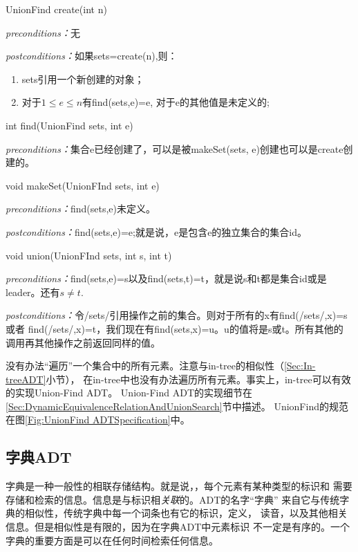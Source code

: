 \begin{figure*}[!t]
\colorbox[rgb]{0.9, 0.9, 0.9}{UnionFind create(int n)}

\emph{preconditions：}无

\emph{postconditions：}如果sets=create(n),则：
\begin{enumerate}
\item sets引用一个新创建的对象；
\item 对于$1\leq e \leq n$有find(sets,e)=e, 对于e的其他值是未定义的;
\end{enumerate}

\colorbox[rgb]{0.9, 0.9, 0.9}{int find(UnionFind sets, int e)}

\emph{preconditions：}集合{e}已经创建了，可以是被makeSet(sets, e)创建也可以是create创建的。

\colorbox[rgb]{0.9, 0.9, 0.9}{void makeSet(UnionFInd sets, int e)}

\emph{preconditions：}find(sets,e)未定义。

\emph{postconditions：}find(sets,e)=e;就是说，e是包含e的独立集合的集合id。

\colorbox[rgb]{0.9, 0.9, 0.9}{void union(UnionFInd sets, int s, int t)}

\emph{preconditions：}find(sets,e)=s以及find(sets,t)=t，就是说s和t都是集合id或是leader。还有$s\neq t$.

\emph{postconditions：}令/sets/引用操作之前的集合。则对于所有的x有find(/sets/,x)=s或者
                        find(/sets/,x)=t，我们现在有find(sets,x)=u。u的值将是s或t。所有其他的
                        调用再其他操作之前返回同样的值。


    \caption{UnionFind ADT的规范。构造函数是create；find是存取函数，makeSet和union是处理函数}
    \label{Fig:UnionFind ADTSpecification}
\end{figure*}

没有办法“遍历”一个集合中的所有元素。注意与in-tree的相似性（\ref{Sec:In-treeADT}小节），
在in-tree中也没有办法遍历所有元素。事实上，in-tree可以有效的实现Union-Find ADT。
Union-Find ADT的实现细节在\ref{Sec:DynamicEquivalenceRelationAndUnionSearch}节中描述。
UnionFind的规范在图\ref{Fig:UnionFind ADTSpecification}中。

\subsection{字典ADT}\label{Sec:2_5_3DictionaryADT}
字典是一种一般性的相联存储结构。就是说，，每个元素有某种类型的标识和
需要存储和检索的信息。信息是与标识相\emph{关联}的。ADT的名字“字典”
来自它与传统字典的相似性，传统字典中每一个词条也有它的标识，定义，
读音，以及其他相关信息。但是相似性是有限的，因为在字典ADT中元素标识
不一定是有序的。一个字典的重要方面是可以在任何时间检索任何信息。

